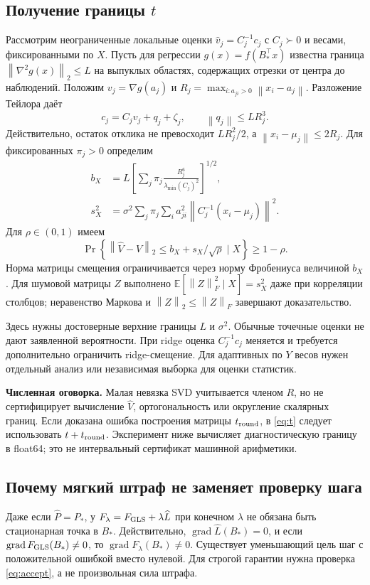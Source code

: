 \documentclass[11pt,a4paper]{article}
\newcommand{\norm}[1]{\left\lVert#1\right\rVert}
\begin{document}
\subsection{Получение границы \texorpdfstring{$t$}{t}}
Рассмотрим неограниченные локальные оценки $\widehat v_j=C_j^{-1}c_j$
с $C_j\succ0$ и весами, фиксированными по $X$. Пусть для регрессии
$g(x)=f(B_*^\top x)$ известна граница $\norm{\nabla^2g(x)}_2\le L$
на выпуклых областях, содержащих отрезки от центра до наблюдений.
Положим $v_j=\nabla g(a_j)$ и
$R_j=\max_{i:a_{ji}>0}\norm{x_i-a_j}$.
Разложение Тейлора даёт
\[
 c_j=C_jv_j+q_j+\zeta_j,\qquad \norm{q_j}\le LR_j^3.
\]
Действительно, остаток отклика не превосходит $LR_j^2/2$, а
$\norm{x_i-\mu_j}\le2R_j$. Для фиксированных $\pi_j>0$ определим
\begin{align}
 b_X&=L\left[\sum_j\pi_j
 \frac{R_j^6}{\lambda_{\min}(C_j)^2}\right]^{1/2},\nonumber\\
 s_X^2&=\sigma^2\sum_j\pi_j\sum_i a_{ji}^2
 \norm{C_j^{-1}(x_i-\mu_j)}^2.\label{eq:variance}
\end{align}
Для $\rho\in(0,1)$ имеем
\begin{equation}\label{eq:probability}
 \Pr\left\{\norm{\widehat V-V}_2
 \le b_X+s_X/\sqrt\rho\mid X\right\}\ge1-\rho.
\end{equation}
Норма матрицы смещения ограничивается через норму Фробениуса величиной
$b_X$. Для шумовой матрицы $Z$ выполнено
$\mathbb E[\norm Z_F^2\mid X]=s_X^2$ даже при корреляции столбцов;
неравенство Маркова и $\norm Z_2\le\norm Z_F$ завершают доказательство.

Здесь нужны достоверные верхние границы $L$ и $\sigma^2$.
Обычные точечные оценки не дают заявленной вероятности. При ridge
оценка $C_j^{-1}c_j$ меняется и требуется дополнительно ограничить
ridge-смещение. Для адаптивных по $Y$ весов нужен отдельный анализ
или независимая выборка для оценки статистик.

\textbf{Численная оговорка.} Малая невязка SVD учитывается членом $R$,
но не сертифицирует вычисление $\widehat V$, ортогональность или
округление скалярных границ. Если доказана ошибка построения матрицы
$t_{\rm round}$, в \eqref{eq:t} следует использовать $t+t_{\rm round}$.
Эксперимент ниже вычисляет диагностическую границу в float64;
это не интервальный сертификат машинной арифметики.

\subsection{Почему мягкий штраф не заменяет проверку шага}
Даже если $\widehat P=P_*$, у $F_\lambda=F_{\rm GLS}+\lambda\widehat L$
при конечном $\lambda$ не обязана быть стационарная точка в $B_*$.
Действительно, $\operatorname{grad}\widehat L(B_*)=0$, и если
$\operatorname{grad}F_{\rm GLS}(B_*)\ne0$, то
$\operatorname{grad}F_\lambda(B_*)\ne0$. Существует уменьшающий цель
шаг с положительной ошибкой вместо нулевой. Для строгой гарантии
нужна проверка \eqref{eq:accept}, а не произвольная сила штрафа.
\end{document}
